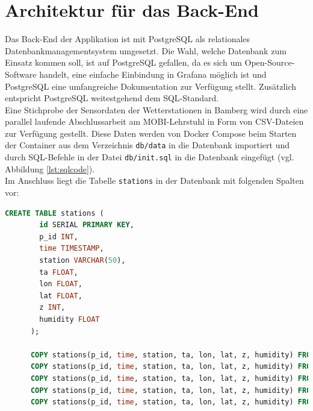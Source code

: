 \section{Architektur für das Back-End}
Das Back-End der Applikation ist mit PostgreSQL als relationales Datenbankmanagementsystem umgesetzt. Die Wahl, welche Datenbank zum Einsatz kommen soll, ist auf PostgreSQL gefallen, da es sich um Open-Source-Software handelt, eine einfache Einbindung in Grafana möglich ist und PostgreSQL eine umfangreiche Dokumentation zur Verfügung stellt. Zusätzlich entspricht PostgreSQL weitestgehend dem SQL-Standard. \\ Eine Stichprobe der Sensordaten der Wetterstationen in Bamberg wird durch eine parallel laufende Abschlussarbeit am \ac{MOBI}-Lehrstuhl in Form von CSV-Dateien zur Verfügung gestellt. Diese Daten werden von Docker Compose beim Starten der Container aus dem Verzeichnis \texttt{db/data} in die Datenbank importiert und durch SQL-Befehle in der Datei \texttt{db/init.sql} in die Datenbank eingefügt (vgl. Abbildung \ref{lst:sqlcode}). \\ Im Anschluss liegt die Tabelle \texttt{stations} in der Datenbank mit folgenden Spalten vor:

\begin{lstlisting}[language=SQL,float=t,
      caption={SQL-Befehle zum Erstellen der Tabelle \texttt{stations} in der Datenbank},label={lst:sqlcode}]
      CREATE TABLE stations (
        id SERIAL PRIMARY KEY,
        p_id INT,
        time TIMESTAMP,
        station VARCHAR(50),
        ta FLOAT,
        lon FLOAT,
        lat FLOAT,
        z INT,
        humidity FLOAT
      );
      
      COPY stations(p_id, time, station, ta, lon, lat, z, humidity) FROM '/data/Bamberg_Stations 01.03.2023to31.03.2023.csv' DELIMITER ';' CSV HEADER;
      COPY stations(p_id, time, station, ta, lon, lat, z, humidity) FROM '/data/Bamberg_Stations 01.04.2023to30.04.2023.csv' DELIMITER ';' CSV HEADER;
      COPY stations(p_id, time, station, ta, lon, lat, z, humidity) FROM '/data/Bamberg_Stations 01.06.2023to30.06.2023.csv' DELIMITER ';' CSV HEADER;
      COPY stations(p_id, time, station, ta, lon, lat, z, humidity) FROM '/data/Bamberg_Stations 01.07.2023to31.07.2023.csv' DELIMITER ';' CSV HEADER;
      COPY stations(p_id, time, station, ta, lon, lat, z, humidity) FROM '/data/Bamberg_Stations 01.08.2023to10.08.2023.csv' DELIMITER ';' CSV HEADER;
      
\end{lstlisting}

